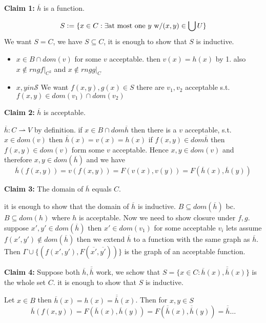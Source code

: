 \textbf{Claim 1:} $\overline{h}$ is a function.
\begin{claimproof}
    $$S\vcentcolon= \{x\in C : \exists \text{at most one $y$ w/} (x,y)\in \bigcup U\}$$
    We want $S = C$, we have $S\subseteq C$,
    it is enough to show that $S$ is inductive.
    \begin{itemize}
        \item $x\in B\cap dom(v)$ for some $v$ acceptable.
        then $v(x) = h(x)$ by 1.
        also $x\notin rng f|_{C^2}$ and $x\notin rng g|_C$
        \item $x,y in \mathcal{S}$
        We want $f(x,y),g(x)\in S$
        there are $v_1,v_2$ acceptable s.t. $f(x,y)\in dom(v_1)\cap dom(v_2)$
    \end{itemize}
\end{claimproof}
\textbf{Claim 2:} $\overline{h}$ is acceptable.
\begin{claimproof}
    $\overline{h}: C \rightharpoonup V$ by definition.
    if $x\in B\cap dom \overline{h}$ then there is a $v$ acceptable, s.t. $x\in dom(v)$
    then $\overline{h}(x) = v(x)=h(x)$
    if $f(x,y)\in dom \overline{h}$ then $f(x,y)\in dom (v)$ form some $v$ acceptable.
    Hence $x,y\in dom(v)$ and therefore $x,y\in dom (\overline{h})$
    and we have $$\overline{h}(f(x,y)) = v(f(x,y)) = F(v(x),v(y)) = F(\overline{h}(x),\overline{h}(y))$$
\end{claimproof}
\textbf{Claim 3:} The domain of $\overline{h}$ equals $C$. 
\begin{claimproof}
    it is enough to show that the domain of $\overline{h}$ is inductive. 
    $B\subseteq dom (\overline{h})$ bc. $B\subseteq dom (h)$ where $h$ is acceptable.
    Now we need to show closure under $f,g$. suppose $x',y'\in dom (\overline{h})$ then $x'\in dom (v_1)$ 
    for some acceptable $v_i$ lets assume $f(x',y')\notin dom (\overline{h})$
    then we extend $\overline{h}$ to a function with the same graph as $\overline{h}$.
    Then
    $\varGamma \cup \{(f(x',y'),F(\overline{x'},\overline{y'}))\}$ 
    is the graph of an acceptable function.
\end{claimproof}
\textbf{Claim 4:} Suppose both $\overline{h},\overline{\overline{h}}$ work, we schow that $S=\{x\in C: \overline{h}(x),\overline{\overline{h}}(x)\}$ is the whole set $C$.
it is enough to show that $S$ is inductive.

Let $x\in B$ then $\overline{h}(x) = h(x) = \overline{\overline{h}}(x)$.
Then for $x,y\in S$ \[\overline{h}(f(x,y)) = F(\overline{h}(x),\overline{h}(y))=  F(\overline{\overline{h}}(x),\overline{\overline{h}}(y))=\overline{\overline{h}}\dots \]
